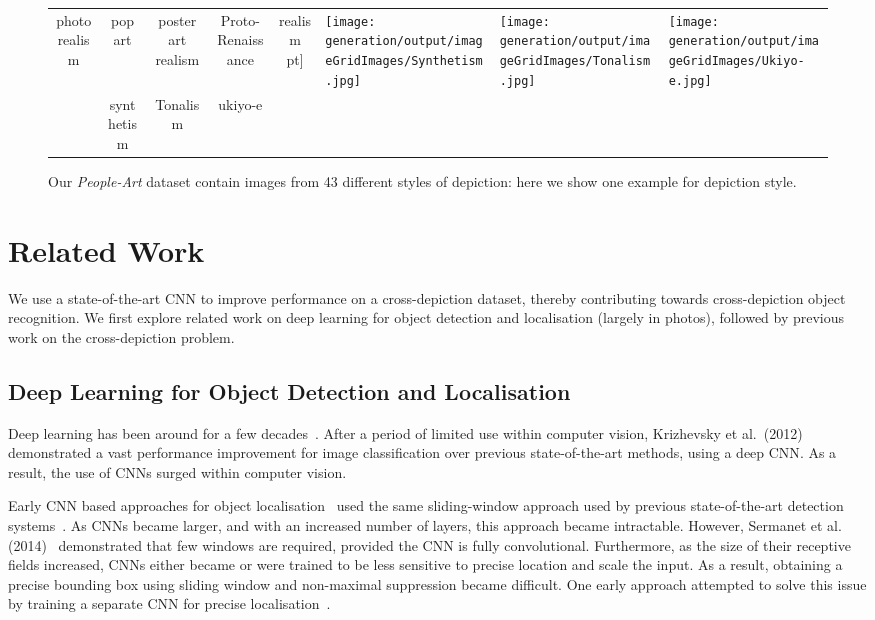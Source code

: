 \documentclass[runningheads]{llncs}
\begin{document}
\begin{figure}[p]
\begin{tabular}{CCCCC}
    photorealism & pop art & poster art realism & Proto-Renaissance & realism 
    \8pt]
    &
    \texttt{[image: generation/output/imageGridImages/Synthetism.jpg]} &
    \texttt{[image: generation/output/imageGridImages/Tonalism.jpg]} &
    \texttt{[image: generation/output/imageGridImages/Ukiyo-e.jpg]} 
    \\
    & synthetism & Tonalism & ukiyo-e  
  \end{tabular}
  \normalsize
  \caption{Our \textit{People-Art} dataset contain  images from 43 different styles of depiction: here we show one example for depiction style.\label{fig:oneImagePerStyle}}
\end{figure}
 
\section{Related Work}
We use a state-of-the-art \ac{CNN} to improve performance on a cross-depiction dataset, thereby contributing towards cross-depiction object recognition.
We first explore related work on deep learning for object detection and localisation (largely in \acp{photo}), followed by previous work on the cross-depiction problem.

\subsection{Deep Learning for Object Detection and Localisation}
Deep learning has been around for a few decades~\cite{fukushima1980neocognitron,giebel1971feature,lecun1989backpropagation}.
After a period of limited use within computer vision, Krizhevsky et al.\ (2012)~\cite{krizhevsky2012imagenet} demonstrated a vast performance improvement for image classification over previous state-of-the-art methods, using a deep \ac{CNN}.
As a result, the use of \acp{CNN} surged within computer vision.

Early \ac{CNN} based approaches for object localisation~\cite{matan1992reading,nowlan1995convolutional,rowley1998neural,sermanet2013pedestrian} used the same sliding-window approach used by previous state-of-the-art detection systems~\cite{dalal2005histograms,felzenszwalb2010object}.
As \acp{CNN} became larger, and with an increased number of layers, this approach became intractable.
However, Sermanet et al. (2014)~\cite{sermanet2014overfeat} demonstrated that few windows are required, provided the \ac{CNN} is fully convolutional.
Furthermore, as the size of their receptive fields increased, \acp{CNN} either became or were trained to be less sensitive to precise location and scale the input.
As a result, obtaining a precise bounding box using sliding window and non-maximal suppression became difficult.
One early approach attempted to solve this issue by training a separate \ac{CNN} for precise localisation~\cite{vaillant1994original}.
\end{document}
